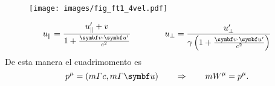\documentclass[10pt,oneside]{CBFT_book}
\begin{document}
\begin{figure}[htb]
	\begin{center}
	\texttt{[image: images/fig\_ft1\_4vel.pdf]}	 
	\end{center}
	\caption{}
\end{figure} 

\[
	u_\parallel = \frac{ u'_\parallel + v}{ 1 + \frac{\pe{v}{u'}}{c^2} } \qquad \qquad 
	u_\perp = \frac{ u'_\perp}{\gamma\left(1 + \frac{\pe{v}{u'}}{c^2}\right)}
\]
De esta manera el cuadrimomento es 
\[
	p^\mu = ( m\Gamma c, m \Gamma \vb{u}) \qquad \Rightarrow \qquad m W^\mu = p^\mu.
\]

\end{document}
